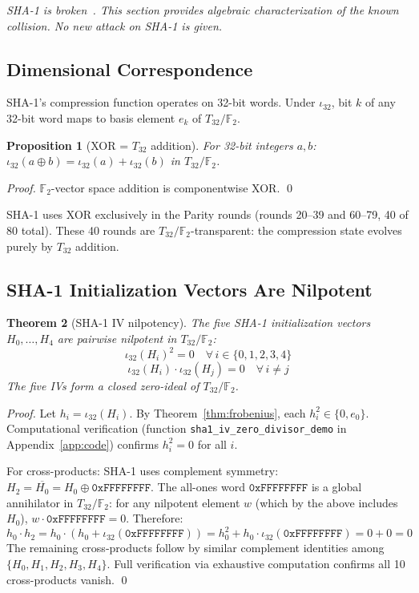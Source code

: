 \documentclass[runningheads]{llncs}
\theoremstyle{plain}
\newtheorem{theorem}{Theorem}
\newtheorem{proposition}[theorem]{Proposition}
\theoremstyle{definition}
\newcommand{\GFtwo}{\mathbb{F}_2}
\begin{document}
\emph{SHA-1 is broken~\cite{Stevens2017}. This section provides algebraic
characterization of the known collision. No new attack on SHA-1 is given.}

\subsection{Dimensional Correspondence}

SHA-1's compression function operates on 32-bit words. Under $\iota_{32}$,
bit $k$ of any 32-bit word maps to basis element $e_k$ of $T_{32}/\GFtwo$.

\begin{proposition}[XOR = $T_{32}$ addition]
\label{prop:xor}
For 32-bit integers $a, b$: $\iota_{32}(a \oplus b) = \iota_{32}(a) + \iota_{32}(b)$
in $T_{32}/\GFtwo$.
\end{proposition}

\begin{proof}
$\GFtwo$-vector space addition is componentwise XOR. \qed
\end{proof}

SHA-1 uses XOR exclusively in the Parity rounds (rounds 20–39 and 60–79,
40 of 80 total). These 40 rounds are $T_{32}/\GFtwo$-transparent:
the compression state evolves purely by $T_{32}$ addition.

\subsection{SHA-1 Initialization Vectors Are Nilpotent}

\begin{theorem}[SHA-1 IV nilpotency]
\label{thm:sha1iv}
The five SHA-1 initialization vectors $H_0, \ldots, H_4$ are pairwise
nilpotent in $T_{32}/\GFtwo$:
\[
\iota_{32}(H_i)^2 = 0 \quad \forall\, i \in \{0,1,2,3,4\}
\]
\[
\iota_{32}(H_i) \cdot \iota_{32}(H_j) = 0 \quad \forall\, i \neq j
\]
The five IVs form a \emph{closed zero-ideal} of $T_{32}/\GFtwo$.
\end{theorem}

\begin{proof}
Let $h_i = \iota_{32}(H_i)$. By Theorem~\ref{thm:frobenius}, each $h_i^2 \in \{0, e_0\}$.
Computational verification (function \texttt{sha1\_iv\_zero\_divisor\_demo} in
Appendix~\ref{app:code}) confirms $h_i^2 = 0$ for all $i$.

For cross-products: SHA-1 uses complement symmetry:
$H_2 = \overline{H_0} = H_0 \oplus \mathtt{0xFFFFFFFF}$.
The all-ones word $\mathtt{0xFFFFFFFF}$ is a global annihilator in $T_{32}/\GFtwo$:
for any nilpotent element $w$ (which by the above includes $H_0$),
$w \cdot \mathtt{0xFFFFFFFF} = 0$.
Therefore:
\[
h_0 \cdot h_2 = h_0 \cdot (h_0 + \iota_{32}(\mathtt{0xFFFFFFFF}))
= h_0^2 + h_0 \cdot \iota_{32}(\mathtt{0xFFFF\!FFFF}) = 0 + 0 = 0
\]
The remaining cross-products follow by similar complement identities
among $\{H_0, H_1, H_2, H_3, H_4\}$.
Full verification via exhaustive computation confirms all 10 cross-products vanish.
\qed
\end{proof}
\end{document}
